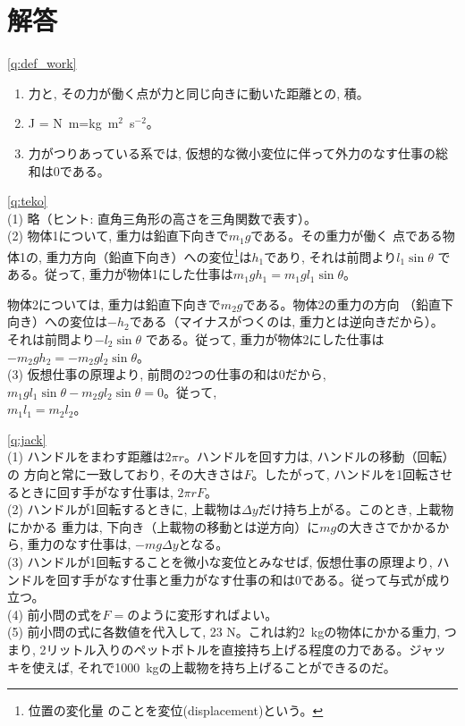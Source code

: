 \section{解答}
% 
\ref{q:def_work}
\begin{enumerate}
\item 力と, その力が働く点が力と同じ向きに動いた距離との, 積。
\item J = N~m=kg~m$^2$~s$^{-2}$。
\item 力がつりあっている系では, 仮想的な微小変位に伴って外力のなす仕事の総和は0である。
\end{enumerate}
\vspace{0.2cm}

% 
\ref{q:teko} \\
(1) 略（ヒント: 直角三角形の高さを三角関数で表す）。\\
(2) 物体1について, 重力は鉛直下向きで$m_1g$である。その重力が働く
点である物体1の, 重力方向（鉛直下向き）への変位\footnote{位置の変化量
のことを変位(displacement)という。}は$h_1$であり, それは前問より$l_1\sin\theta$
である。従って, 重力が物体1にした仕事は$m_1gh_1=m_1gl_1\sin\theta$。

物体2については, 重力は鉛直下向きで$m_2g$である。物体2の重力の方向
（鉛直下向き）への変位は$-h_2$である（マイナスがつくのは, 重力とは逆向きだから）。
それは前問より$-l_2\sin\theta$
である。従って, 重力が物体2にした仕事は
$-m_2gh_2=-m_2gl_2\sin\theta$。\\
(3) 仮想仕事の原理より, 前問の2つの仕事の和は0だから, 
$m_1gl_1\sin\theta-m_2gl_2\sin\theta=0$。従って, \\
$m_1l_1=m_2l_2$。
\vspace{0.2cm}

%
\ref{q:jack} \\
(1) ハンドルをまわす距離は$2\pi r$。ハンドルを回す力は, ハンドルの移動（回転）の
方向と常に一致しており, その大きさは$F$。したがって, ハンドルを1回転させるときに回す手がなす仕事は, 
$2\pi r F$。\\
(2) ハンドルが1回転するときに, 上載物は$\Delta y$だけ持ち上がる。このとき, 上載物にかかる
重力は, 下向き（上載物の移動とは逆方向）に$mg$の大きさでかかるから, 重力のなす仕事は, 
$-mg\Delta y$となる。\\
(3) ハンドルが1回転することを微小な変位とみなせば, 仮想仕事の原理より, 
ハンドルを回す手がなす仕事と重力がなす仕事の和は0である。従って与式が成り立つ。\\
(4) 前小問の式を$F=$のように変形すればよい。\\
(5) 前小問の式に各数値を代入して, 23 N。これは約2~kgの物体にかかる重力, つまり, 
2リットル入りのペットボトルを直接持ち上げる程度の力である。ジャッキを使えば, 
それで1000~kgの上載物を持ち上げることができるのだ。
\vspace{0.2cm}

